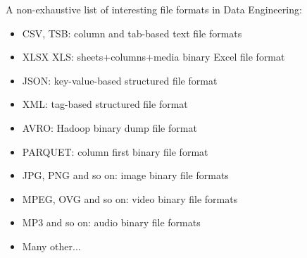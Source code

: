 \documentclass[handout]{beamer}[10pt, usepdftitle=false]
\begin{document}
	\begin{frame}
	
	A non-exhaustive list of interesting file formats in Data Engineering:
	\vspace*{0.6em}	

	\begin{itemize}
		\item{CSV, TSB: column and tab-based text file formats}
		\item{XLSX XLS: sheets+columns+media binary Excel file format}
		\item{JSON: key-value-based structured file format}
		\item{XML: tag-based structured file format}
		\item{AVRO: Hadoop binary dump file format}
		\item{PARQUET: column first binary file format}
		\item{JPG, PNG and so on: image binary file formats}
		\item{MPEG, OVG and so on: video binary file formats}
		\item{MP3 and so on: audio binary file formats}
		\item{Many other...}
	\end{itemize}
	
	\end{frame}	
\end{document}
